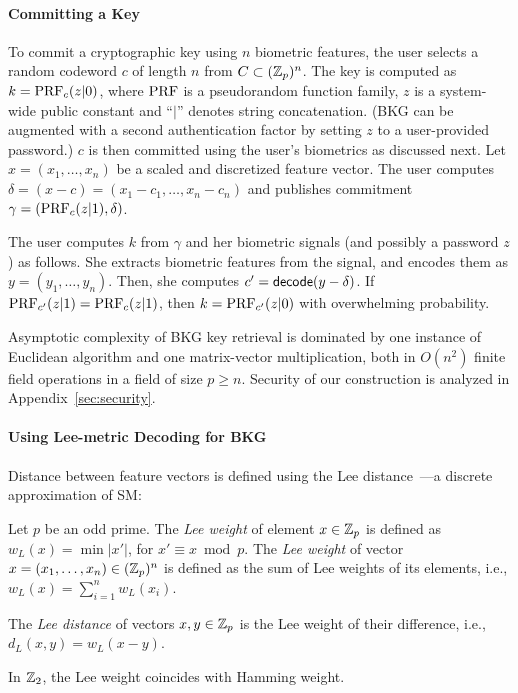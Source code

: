 \paragraph{Committing a Key}
To commit a cryptographic key using $n$ biometric features, the user 
selects a random codeword $c$ of length $n$ from $C\subset(\mathbb{Z}_p)^n$. The key is 
computed as $k = \operatorname{PRF}_c(z|0)$, where $\operatorname{PRF}$ is a pseudorandom function family, 
$z$ is a system-wide public constant and ``$|$'' denotes string concatenation. (BKG can be augmented with a second authentication factor by setting $z$ to a user-provided password.) $c$ is then committed using the user's biometrics as discussed next. 
Let $x = (x_1, \ldots, x_n)$ be a scaled and discretized feature vector. The user 
computes $\delta = (x-c) = (x_1-c_1, \ldots, x_n-c_n)$ and publishes commitment $
\gamma = (\operatorname{PRF}_c(z|1), \delta)$.

The user computes $k$ from $\gamma$ and her biometric signals (and possibly a 
password $z$) as follows. She extracts biometric features from the signal, and 
encodes them as $y=(y_1,\ldots,y_n)$. Then, she computes $c' = {\sf decode}(y-
\delta)$. If $\operatorname{PRF}_{c'}(z|1) = \operatorname{PRF}_c(z|1)$, then $k=\operatorname{PRF}_{c'}(z|0)$ with overwhelming probability. 

Asymptotic complexity of BKG key retrieval is dominated by one instance of Euclidean algorithm and one matrix-vector multiplication, both in $O(n^2)$ finite field operations in a field of size $p \geq n$. Security of our construction is analyzed in Appendix~\ref{sec:security}.  %

\paragraph{Using Lee-metric Decoding for BKG}
Distance between feature vectors is defined using the Lee distance~\cite{lee58}---a discrete approximation of SM:

\begin{definition}
Let $p$ be an odd prime. The \emph{Lee weight} of element $x \in \mathbb{Z}_p$ is defined as $w_L(x) = \min|x'|$, for $x' \equiv x \bmod{p}$. %
The \emph{Lee weight} of vector $x = (x_1,\ldots, x_n) \in (\mathbb{Z}_p)^n$ is defined as the sum of Lee weights of its elements, i.e., $w_L(x) = \sum_{i=1}^n{w_L(x_i)}$.
\end{definition}

\begin{definition}
The \emph{Lee distance} of vectors $x, y \in \mathbb{Z}_p$ is the Lee weight of their difference, i.e., $d_L(x, y) = w_L(x - y)$. 
\end{definition}
In $\mathbb{Z}_2$, the Lee weight coincides with Hamming weight.

